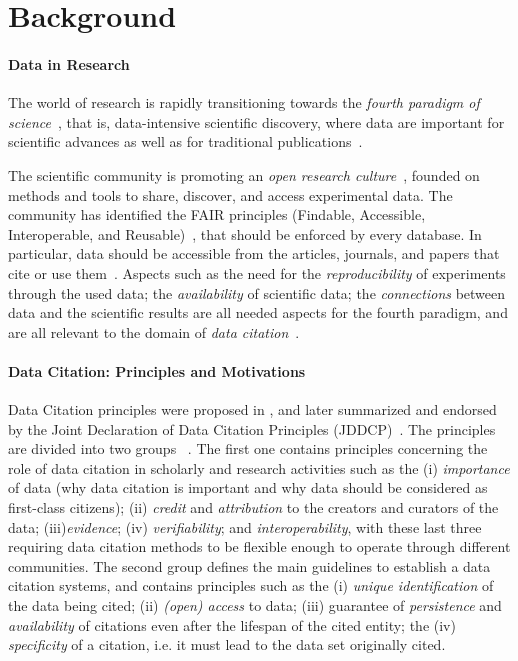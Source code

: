 \section{Background}
\label{sec:related}

\paragraph{Data in Research} %
The world of research is rapidly transitioning towards the \emph{fourth paradigm of science}~\citep{hey2009jim}, that is, data-intensive scientific discovery, where data are important for scientific advances as well as for traditional publications~\citep{Bechhofer2013linkisnotenough}.

The scientific community is promoting an \emph{open research culture}~\citep{nosek2015promoting}, founded on methods and tools to share, discover, and access experimental data. 
The community has identified the FAIR principles (Findable, Accessible, Interoperable, and Reusable)~\citep{fair2016Wilikinson}, that should be enforced by every database. 
In particular, data should be accessible from the articles, journals, and papers that cite or use them~\citep{cousijn2019bringing}.
Aspects such as the need for the \emph{reproducibility} of experiments through the used data; the \emph{availability} of scientific data; the \emph{connections} between data and the scientific results are all needed aspects for the fourth paradigm, and are all relevant to the domain of \emph{data citation}~\citep{honor2016data}.

\paragraph{Data Citation: Principles and Motivations} Data Citation principles were proposed in \citep{CODATA2013}, and later summarized and endorsed by the Joint Declaration of Data Citation Principles (JDDCP)~\citep{martone2014joint}. 
The principles are divided into two groups~ \citep{Silvello18jasist}. The first one contains principles concerning the role of data citation in scholarly and research activities such as the (i) \emph{importance} of data (why data citation is important and why data should be considered as first-class citizens); (ii) \emph{credit} and \emph{attribution} to the creators and curators of the data; (iii)\emph{evidence}; (iv) \emph{verifiability}; and \emph{interoperability}, with these last three requiring data citation methods to be flexible enough to operate through different communities. 
The second group defines the main guidelines to establish a data citation systems, and contains principles such as the (i) \emph{unique identification} of the data being cited; (ii) \emph{(open) access} to data; (iii) guarantee of \emph{persistence} and \emph{availability} of citations even after the lifespan of the cited entity; the (iv) \emph{specificity} of a citation, i.e. it must lead to the data set originally cited.

